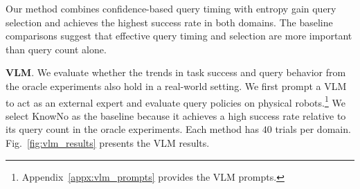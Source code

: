 Our method combines confidence-based query timing with entropy gain query selection and achieves the highest success rate in both domains. The baseline comparisons suggest that effective query timing and selection are more important than query count alone.

\noindent\textbf{VLM}\label{exp:vlm_eval}. We evaluate whether the trends in task success and query behavior from the oracle experiments also hold in a real-world setting. We first prompt a VLM to act as an external expert and evaluate query policies on physical robots.\footnote{Appendix~\ref{appx:vlm_prompts} provides the VLM prompts.} We select KnowNo as the baseline because it achieves a high success rate relative to its query count in the oracle experiments. Each method has $40$ trials per domain. Fig.~\ref{fig:vlm_results} presents the VLM results.

